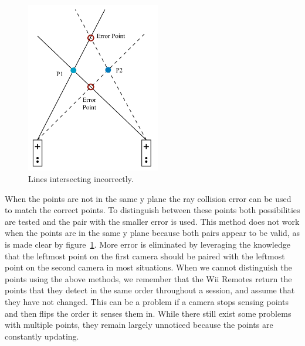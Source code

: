 \documentclass[a4paper,twoside]{article}
\begin{document}
\begin{figure}[ht] \begin{center}
\includegraphics[height = 7.5cm]{Diagram5_IntersectingRays} \end{center}
\caption{Lines intersecting incorrectly.} \label{intersection} \end{figure}

When the points are not in the same y plane the ray collision  error can be
used to match the correct points. To distinguish between these points both
possibilities are tested and the pair with the smaller error is used. This
method does not work when the points are in the same y plane because both pairs
appear to be valid, as is made clear by figure~\ref{intersection}. More error
is eliminated by leveraging the knowledge that the leftmost point on the first
camera should be paired with the leftmost point on the second camera in most
situations. When we cannot distinguish the points using the above methods, we
remember that the Wii Remotes return the points that they detect in the same
order throughout a session, and assume that they have not changed. This can be
a problem if a camera stops sensing points and then flips the order it senses
them in. While there still exist some problems with multiple points, they
remain largely unnoticed because the points are constantly updating.
\end{document}
